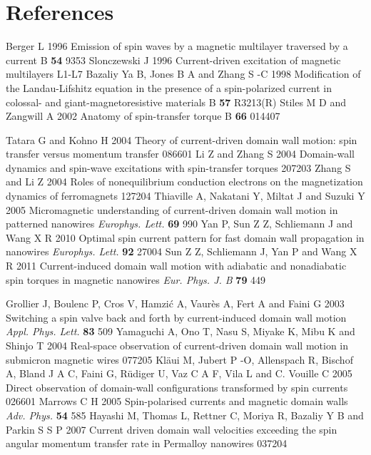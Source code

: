 \documentclass[12pt]{iopart}
\begin{document}
\section*{References}
\begin{thebibliography}{99}

 Berger L 1996 Emission of spin waves by a magnetic multilayer traversed by a current \PR B {\bf 54} 9353
 Slonczewski J 1996 Current-driven excitation of magnetic multilayers  L1-L7
 Bazaliy Ya B, Jones B A and Zhang S -C 1998 Modification of the Landau-Lifshitz equation in the presence of a spin-polarized current in colossal- and giant-magnetoresistive materials \PR B {\bf 57}  R3213(R)
 Stiles M D and Zangwill A 2002 Anatomy of spin-transfer torque \PR B {\bf 66} 014407

 Tatara G and Kohno H 2004 Theory of current-driven domain wall motion: spin transfer versus momentum transfer  086601
 Li Z and Zhang S 2004 Domain-wall dynamics and spin-wave excitations with spin-transfer torques  207203
 Zhang S and Li Z 2004 Roles of nonequilibrium conduction electrons on the magnetization dynamics of ferromagnets  127204
 Thiaville A, Nakatani Y, Miltat J and Suzuki Y 2005 Micromagnetic understanding of current-driven domain wall motion in patterned nanowires {\it Europhys. Lett.} {\bf 69} 990
 Yan P, Sun Z Z, Schliemann J and Wang X R 2010 Optimal spin current pattern for fast domain wall propagation in nanowires {\it Europhys. Lett.} {\bf 92} 27004
 Sun Z Z, Schliemann J, Yan P and Wang X R 2011 Current-induced domain wall motion with adiabatic and nonadiabatic spin torques in magnetic nanowires {\it Eur. Phys. J. B} {\bf 79} 449

 Grollier J, Boulenc P, Cros V, Hamzi\'{c} A, Vaur\`{e}s A, Fert A and Faini G 2003 Switching a spin valve back and forth by current-induced domain wall motion {\it Appl. Phys. Lett.} {\bf 83} 509
 Yamaguchi A, Ono T, Nasu S, Miyake K, Mibu K and Shinjo T 2004 Real-space observation of current-driven domain wall motion in submicron magnetic wires  077205
 Kl\"{a}ui M, Jubert P -O, Allenspach R, Bischof A, Bland J A C, Faini G, R\"{u}diger U, Vaz C A F, Vila L and C. Vouille C 2005 Direct observation of domain-wall conﬁgurations transformed by spin currents  026601
 Marrows C H 2005 Spin-polarised currents and magnetic domain walls {\it Adv. Phys.} {\bf 54} 585
 Hayashi M, Thomas L, Rettner C, Moriya R, Bazaliy Y B and Parkin S S P 2007 Current driven domain wall velocities exceeding the spin angular momentum transfer rate in Permalloy nanowires  037204


\end{thebibliography}
\end{document}
